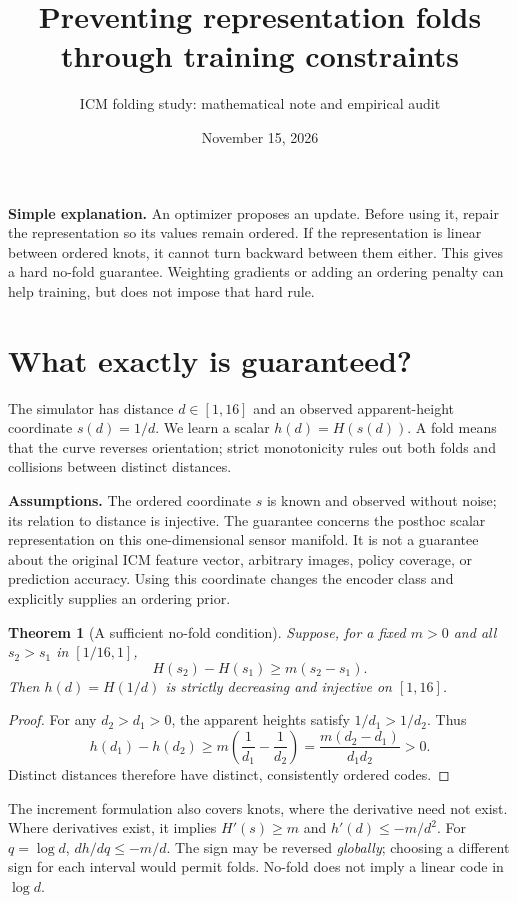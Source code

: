 \documentclass[11pt]{article}
\title{Preventing representation folds through training constraints}
\author{ICM folding study: mathematical note and empirical audit}
\date{November 15, 2026}
\newtheorem{theorem}{Theorem}
\begin{document}
\maketitle
\vspace{-1em}
\textbf{Simple explanation.} An optimizer proposes an update. Before using it,
repair the representation so its values remain ordered. If the representation
is linear between ordered knots, it cannot turn backward between them either.
This gives a hard no-fold guarantee. Weighting gradients or adding an ordering
penalty can help training, but does not impose that hard rule.

\section{What exactly is guaranteed?}
The simulator has distance $d\in[1,16]$ and an observed apparent-height
coordinate $s(d)=1/d$. We learn a scalar $h(d)=H(s(d))$. A fold means that
the curve reverses orientation; strict monotonicity rules out both folds and
collisions between distinct distances.

\textbf{Assumptions.} The ordered coordinate $s$ is known and observed without
noise; its relation to distance is injective. The guarantee concerns the
posthoc scalar representation on this one-dimensional sensor manifold.
It is not a guarantee about the original ICM feature vector, arbitrary
images, policy coverage, or prediction accuracy. Using this coordinate changes
the encoder class and explicitly supplies an ordering prior.

\begin{theorem}[A sufficient no-fold condition]
Suppose, for a fixed $m>0$ and all $s_2>s_1$ in $[1/16,1]$,
\begin{equation}\label{eq:increment}
 H(s_2)-H(s_1)\ge m(s_2-s_1).
\end{equation}
Then $h(d)=H(1/d)$ is strictly decreasing and injective on $[1,16]$.
\end{theorem}
\begin{proof}
For any $d_2>d_1>0$, the apparent heights satisfy $1/d_1>1/d_2$. Thus
\begin{equation}\label{eq:distance}
h(d_1)-h(d_2)\ge m\left(\frac1{d_1}-\frac1{d_2}\right)
=\frac{m(d_2-d_1)}{d_1d_2}>0.
\end{equation}
Distinct distances therefore have distinct, consistently ordered codes.
\end{proof}
The increment formulation also covers knots, where the derivative need not
exist. Where derivatives exist, it implies $H'(s)\ge m$ and
$h'(d)\le-m/d^2$. For $q=\log d$, $dh/dq\le-m/d$.
The sign may be reversed \emph{globally}; choosing a different sign for each
interval would permit folds. No-fold does not imply a linear code in $\log d$.
\end{document}

